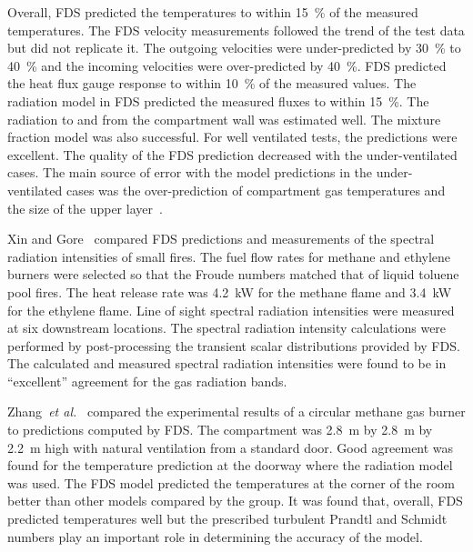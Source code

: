 Overall,  FDS  predicted  the  temperatures  to within  15~\%  of  the measured  temperatures.  The  FDS velocity  measurements  followed the trend
of  the test  data  but did  not  replicate  it.  The  outgoing velocities  were under-predicted by  30~\% to  40~\% and  the incoming velocities
were  over-predicted by 40~\%. FDS predicted  the heat flux gauge response to within 10~\%  of the measured values.  The radiation model  in FDS
predicted the  measured  fluxes to  within 15~\%.   The radiation to  and from the  compartment wall was estimated  well.  The mixture  fraction
model was  also  successful.   For well  ventilated tests,  the  predictions  were  excellent.   The quality  of  the  FDS prediction decreased with
the under-ventilated cases.  The main source of error with the model  predictions in the under-ventilated cases was the over-prediction  of
compartment gas  temperatures and the  size of the upper layer~\cite{Floyd:1,Floyd:6}.

Xin   and  Gore~\cite{Xin:JSS2003}   compared   FDS  predictions   and measurements  of the  spectral radiation  intensities of  small fires. The
fuel flow rates for  methane and ethylene burners were selected so that the  Froude numbers  matched that of  liquid toluene  pool fires. The heat
release rate was 4.2~kW  for the methane flame and 3.4~kW for the ethylene flame.  Line of sight spectral radiation intensities were measured  at
six  downstream  locations.    The  spectral  radiation intensity calculations were performed by post-processing the transient scalar  distributions
provided  by FDS.   The calculated  and measured spectral  radiation  intensities were  found  to  be in  ``excellent'' agreement for the gas
radiation bands.

Zhang~{\em et al.}~\cite{Zhang:1} compared the experimental results of a  circular methane  gas burner  to predictions  computed by  FDS. The
compartment was 2.8~m by 2.8~m  by 2.2~m high with natural ventilation from a  standard door.  Good agreement was  found for  the temperature
prediction at the doorway where  the radiation model was used. The FDS model predicted the temperatures at the corner of the room better than other
models  compared by the group.  It was found  that, overall, FDS predicted temperatures  well but the prescribed  turbulent Prandtl and Schmidt
numbers play an important  role in determining the accuracy of the model.


